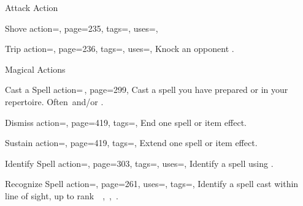 \begin{PageBackLandscape}
\begin{TablesHalf}{\backTableHeight}
\begin{Table}{Attack Action}
\begin{entry}{Shove}{%
                action=,
                page=235,
                tags=\Attack,
                uses=\AthleticsFortitude,
            }
            \end{entry}
            \begin{entry}{Trip}{%
                action=,
                page=236,
                tags=\Attack,
                uses=\AthleticsReflex,
            }
                Knock an opponent \Prone.\hfill
                \quad{}
            \end{entry}
        \end{Table}
        \TableSpace
        \begin{Table}{Magical Actions}
            \begin{entry}{Cast a Spell}{%
                action={\,\sffamily{}},
                page=299,
            }
                Cast a spell you have prepared or in your repertoire. Often \Manipulate\,and/or \Concentrate.\hfill
            \end{entry}
            \begin{entry}{Dismiss}{%
                action=,
                page=419,
                tags=\Concentrate,
            }
                End one spell or item effect.
            \end{entry}
            \begin{entry}{Sustain}{%
                action=,
                page=419,
                tags=\Concentrate,
            }
                Extend one spell or item effect.\hfill
            \end{entry}
            \begin{entry}{Identify Spell}{%
                action=,
                page=303,
                tags=\Concentrate,
                uses={\MagicalSkill[tags={S}]},
            }
                Identify a spell using .
            \end{entry}
            \begin{entry}{Recognize Spell}{%
                action=,
                page=261,
                uses={\MagicalSkill[tags={T,S}]\Feat},
                tags=\Concentrate,
            }
                Identify a spell cast within line of sight, up to rank \Ts\, \E\,, \M\,, \Le\,.

\end{entry}
\end{Table}
\end{TablesHalf}
\end{PageBackLandscape}
